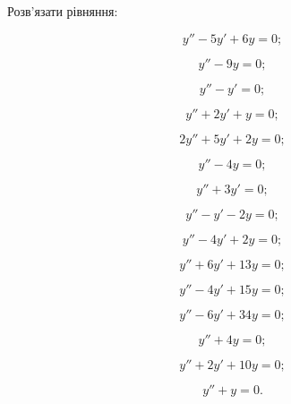 Розв'язати рівняння:
\begin{multicols}{2}
    \begin{problem}
    	\[y''-5y'+6y=0;\]
    \end{problem}
    
    \begin{problem}
    	\[y''-9y=0;\]
    \end{problem}
    
    \begin{problem}
    	\[y''-y'=0;\]
    \end{problem}
    
    \begin{problem}
    	\[y''+2y'+y=0;\]
    \end{problem}
    
    \begin{problem}
    	\[2y''+5y'+2y=0;\]
    \end{problem}
    
    \begin{problem}
    	\[y''-4y=0;\]
    \end{problem}
    
    \begin{problem}
    	\[y''+3y'=0;\]
    \end{problem}
    
    \begin{problem}
    	\[y''-y'-2y=0;\]
    \end{problem}
    
    \begin{problem}
    	\[y''-4y'+2y=0;\]
    \end{problem}
    
    \begin{problem}
    	\[y''+6y'+13y=0;\]
    \end{problem}
    
    \begin{problem}
    	\[y''-4y'+15y=0;\]
    \end{problem}
    
    \begin{problem}
    	\[y''-6y'+34y=0;\]
    \end{problem}
    
    \begin{problem}
    	\[y''+4y=0;\]
    \end{problem}
    
    \begin{problem}
    	\[y''+2y'+10y=0;\]
    \end{problem}
    
    \begin{problem}
    	\[y''+y=0.\]
    \end{problem}
\end{multicols}

